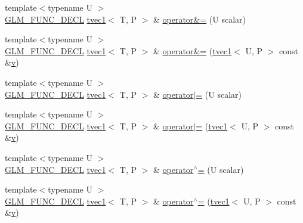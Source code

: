 \begin{DoxyCompactItemize}
\item 
{\footnotesize template$<$typename U $>$ }\\\mbox{\hyperlink{setup_8hpp_ab2d052de21a70539923e9bcbf6e83a51}{G\+L\+M\+\_\+\+F\+U\+N\+C\+\_\+\+D\+E\+CL}} \mbox{\hyperlink{structglm_1_1tvec1}{tvec1}}$<$ T, P $>$ \& \mbox{\hyperlink{structglm_1_1tvec1_adacd90928e1aac2b8f2eff7e139e228c}{operator\&=}} (U scalar)
\item 
{\footnotesize template$<$typename U $>$ }\\\mbox{\hyperlink{setup_8hpp_ab2d052de21a70539923e9bcbf6e83a51}{G\+L\+M\+\_\+\+F\+U\+N\+C\+\_\+\+D\+E\+CL}} \mbox{\hyperlink{structglm_1_1tvec1}{tvec1}}$<$ T, P $>$ \& \mbox{\hyperlink{structglm_1_1tvec1_a672c44812f4806e389fd1ec24466b0d8}{operator\&=}} (\mbox{\hyperlink{structglm_1_1tvec1}{tvec1}}$<$ U, P $>$ const \&\mbox{\hyperlink{glad_8h_a14cfbe2fc2234f5504618905b69d1e06}{v}})
\item 
{\footnotesize template$<$typename U $>$ }\\\mbox{\hyperlink{setup_8hpp_ab2d052de21a70539923e9bcbf6e83a51}{G\+L\+M\+\_\+\+F\+U\+N\+C\+\_\+\+D\+E\+CL}} \mbox{\hyperlink{structglm_1_1tvec1}{tvec1}}$<$ T, P $>$ \& \mbox{\hyperlink{structglm_1_1tvec1_aced10faa0a595046810e9560fe225dcb}{operator$\vert$=}} (U scalar)
\item 
{\footnotesize template$<$typename U $>$ }\\\mbox{\hyperlink{setup_8hpp_ab2d052de21a70539923e9bcbf6e83a51}{G\+L\+M\+\_\+\+F\+U\+N\+C\+\_\+\+D\+E\+CL}} \mbox{\hyperlink{structglm_1_1tvec1}{tvec1}}$<$ T, P $>$ \& \mbox{\hyperlink{structglm_1_1tvec1_a6c8723729c52dbf1511bb50723f686c0}{operator$\vert$=}} (\mbox{\hyperlink{structglm_1_1tvec1}{tvec1}}$<$ U, P $>$ const \&\mbox{\hyperlink{glad_8h_a14cfbe2fc2234f5504618905b69d1e06}{v}})
\item 
{\footnotesize template$<$typename U $>$ }\\\mbox{\hyperlink{setup_8hpp_ab2d052de21a70539923e9bcbf6e83a51}{G\+L\+M\+\_\+\+F\+U\+N\+C\+\_\+\+D\+E\+CL}} \mbox{\hyperlink{structglm_1_1tvec1}{tvec1}}$<$ T, P $>$ \& \mbox{\hyperlink{structglm_1_1tvec1_a04b2e23d74453c11bbab313f4b7cdd71}{operator$^\wedge$=}} (U scalar)
\item 
{\footnotesize template$<$typename U $>$ }\\\mbox{\hyperlink{setup_8hpp_ab2d052de21a70539923e9bcbf6e83a51}{G\+L\+M\+\_\+\+F\+U\+N\+C\+\_\+\+D\+E\+CL}} \mbox{\hyperlink{structglm_1_1tvec1}{tvec1}}$<$ T, P $>$ \& \mbox{\hyperlink{structglm_1_1tvec1_abc6f6df2f1164cb293976e0418e44690}{operator$^\wedge$=}} (\mbox{\hyperlink{structglm_1_1tvec1}{tvec1}}$<$ U, P $>$ const \&\mbox{\hyperlink{glad_8h_a14cfbe2fc2234f5504618905b69d1e06}{v}})

\end{DoxyCompactItemize}

